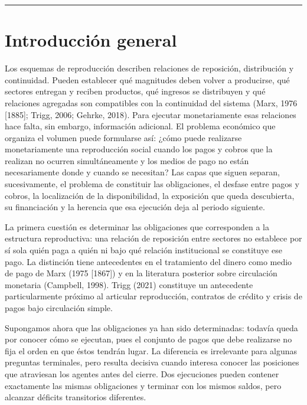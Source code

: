 \documentclass[10pt,a5paper,twoside]{article}
\newcommand{\RBfronttitle}[1]{\phantomsection\addcontentsline{toc}{section}{#1}}
\begin{document}
\begin{center}\rule{0.5\linewidth}{0.5pt}\end{center}

\cleardoublepage\section*{Introducción general}\label{introducciuxf3n-general}\RBfronttitle{Introducción general}\thispagestyle{plain}

Los esquemas de reproducción describen relaciones de reposición,
distribución y continuidad. Pueden establecer qué magnitudes deben volver a
producirse, qué sectores entregan y reciben productos, qué ingresos se
distribuyen y qué relaciones agregadas son compatibles con la continuidad del
sistema (Marx, 1976 {[}1885{]}; Trigg, 2006; Gehrke, 2018). Para ejecutar
monetariamente esas relaciones hace falta, sin embargo, información
adicional. El problema económico que organiza el volumen puede formularse así: ¿cómo
puede realizarse monetariamente una reproducción social cuando los pagos y cobros que
la realizan no ocurren simultáneamente y los medios de pago no están necesariamente
donde y cuando se necesitan? Las capas que siguen separan, sucesivamente, el problema
de constituir las obligaciones, el desfase entre pagos y cobros, la localización de la
disponibilidad, la exposición que queda descubierta, su financiación y la herencia que
esa ejecución deja al periodo siguiente.

La primera cuestión es determinar las obligaciones que corresponden a la
estructura reproductiva: una relación de reposición entre sectores no
establece por sí sola quién paga a quién ni bajo qué relación institucional
se constituye ese pago. La distinción tiene antecedentes en el tratamiento
del dinero como medio de pago de Marx (1975 {[}1867{]}) y en la literatura
posterior sobre circulación monetaria (Campbell, 1998). Trigg (2021)
constituye un antecedente particularmente próximo al articular reproducción,
contratos de crédito y crisis de pagos bajo circulación simple.

Supongamos ahora que las obligaciones ya han sido determinadas: todavía queda
por conocer cómo se ejecutan, pues el conjunto de pagos que debe realizarse no
fija el orden en que éstos tendrán lugar. La diferencia es irrelevante para algunas
preguntas terminales, pero resulta decisiva cuando interesa conocer las
posiciones que atraviesan los agentes antes del cierre. Dos ejecuciones pueden
contener exactamente las mismas obligaciones y terminar con los mismos
saldos, pero alcanzar déficits transitorios diferentes.
\end{document}
